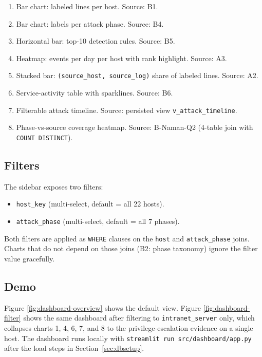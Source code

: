 \begin{enumerate}
  \item Bar chart: labeled lines per host. Source: B1. %
  \item Bar chart: labels per attack phase. Source: B4. %
  \item Horizontal bar: top-10 detection rules. Source: B5. %
  \item Heatmap: events per day per host with rank highlight.
    Source: A3. %
  \item Stacked bar: \texttt{(source\_host, source\_log)} share of
    labeled lines. Source: A2. %
  \item Service-activity table with sparklines. Source: B6. %
  \item Filterable attack timeline. Source: persisted view
    \texttt{v\_attack\_timeline}. %
  \item Phase-vs-source coverage heatmap. Source: B-Naman-Q2 (4-table
    join with \texttt{COUNT DISTINCT}).
\end{enumerate}

\subsection{Filters}
The sidebar exposes two filters:
\begin{itemize}
  \item \texttt{host\_key} (multi-select, default = all 22 hosts).
  \item \texttt{attack\_phase} (multi-select, default = all 7 phases).
\end{itemize}
Both filters are applied as \texttt{WHERE} clauses on the
\texttt{host} and \texttt{attack\_phase} joins. Charts that do not
depend on those joins (B2: phase taxonomy) ignore the filter value
gracefully.

\subsection{Demo}
Figure \ref{fig:dashboard-overview} shows the default view. Figure
\ref{fig:dashboard-filter} shows the same dashboard after filtering to
\texttt{intranet\_server} only, which collapses charts 1, 4, 6, 7, and 8
to the privilege-escalation evidence on a single host. The dashboard
runs locally with \texttt{streamlit run src/dashboard/app.py} after the
load steps in Section~\ref{sec:dbsetup}.

